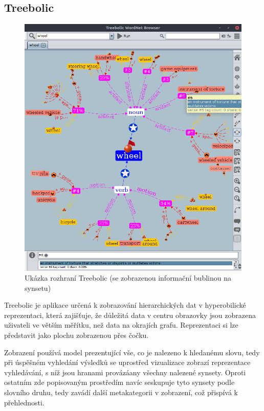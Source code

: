 \documentclass[a4paper, 11pt, oneside]{book}
\begin{document}
				\subsection{Treebolic}

					\begin{figure}[ht]
						\centering
						\includegraphics[width=1.0\textwidth]{wntreebolic.png}
						\caption{Ukázka rozhraní Treebolic (se zobrazenou informační bublinou na synsetu)}
						\label{fig:wntreebolic}
					\end{figure}

					Treebolic je aplikace určená k zobrazování hierarchických dat v hyperobilické reprezentaci, která zajišťuje, že důležitá data v centru obrazovky jsou zobrazena uživateli ve větším měřítku, než data na okrajích grafu. Reprezentaci si lze představit jako plochu zobrazenou přes čočku. \parencite{boutreebolic}

					Zobrazení používá model prezentující vše, co je nalezeno k hledanému slovu, tedy při úspěšném vyhledání výsledků se uprostřed vizualizace zobrazí reprezentace vyhledávání, s níž jsou hranami provázáany všechny nalezené synsety. Oproti ostatním zde popisovaným prostředím navíc seskupuje tyto synsety podle slovního druhu, tedy zavádí další metakategorii v zobrazení, což přispívá k přehlednosti. 
\end{document}
